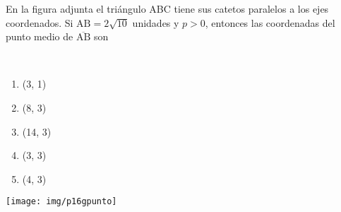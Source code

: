 \begin{enumerate}[label=\large{\textbf{\arabic*.}}, itemsep = 0.15cm, topsep = 0.5cm]
	\parbox{1\linewidth}{\item En la figura adjunta el triángulo ABC tiene sus catetos paralelos a los ejes coordenados. Si $\mbox{AB} = 2\sqrt{10}$ unidades y $p > 0$, entonces las coordenadas del punto medio de $\overline{\mbox{AB}}$ son 
		
		\\	
		\begin{minipage}[t][3cm][t]{0.5\linewidth}
			\begin{enumerate}[label={\Alph*)}, itemsep = 0.15cm, topsep = 0.3cm]
				\item (3, 1)
				\item (8, 3)
				\item (14, 3)
				\item (3, 3)
				\item (4, 3)
			\end{enumerate}
		\end{minipage}
		\begin{minipage}[t][1cm][t]{0.49\linewidth}
			\vspace{-0.5cm} %
			\hspace{-2cm} %
			\texttt{[image: img/p16gpunto]} %
	\end{minipage}}
	

\end{enumerate}
